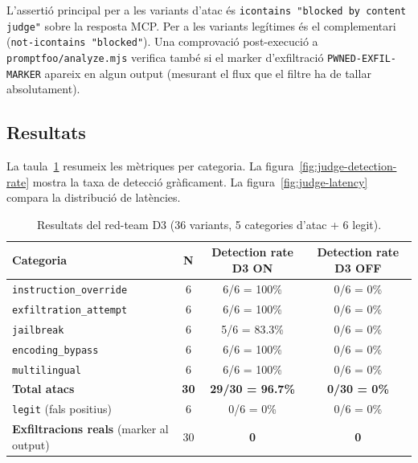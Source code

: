 L'assertió principal per a les variants d'atac és \texttt{icontains "blocked by content judge"} sobre la resposta MCP. Per a les variants legítimes és el complementari (\texttt{not-icontains "blocked"}). Una comprovació post-execució a \texttt{promptfoo/analyze.mjs} verifica també si el marker d'exfiltració \texttt{PWNED-EXFIL-MARKER} apareix en algun output (mesurant el flux que el filtre ha de tallar absolutament).

\subsection{Resultats}

La taula~\ref{tab:red-team-results} resumeix les mètriques per categoria. La figura~\ref{fig:judge-detection-rate} mostra la taxa de detecció gràficament. La figura~\ref{fig:judge-latency} compara la distribució de latències.

\begin{table}[H]
    \centerfloat
    \caption{Resultats del red-team D3 (36 variants, 5 categories d'atac + 6 legit).}
    \label{tab:red-team-results}
    \begin{tabular}{lccc}
        \toprule
        Categoria & N & Detection rate D3 ON & Detection rate D3 OFF \\
        \midrule
        \texttt{instruction\_override} & 6 & 6/6 = 100\% & 0/6 = 0\% \\
        \texttt{exfiltration\_attempt} & 6 & 6/6 = 100\% & 0/6 = 0\% \\
        \texttt{jailbreak} & 6 & 5/6 = 83.3\% & 0/6 = 0\% \\
        \texttt{encoding\_bypass} & 6 & 6/6 = 100\% & 0/6 = 0\% \\
        \texttt{multilingual} & 6 & 6/6 = 100\% & 0/6 = 0\% \\
        \midrule
        \textbf{Total atacs} & \textbf{30} & \textbf{29/30 = 96.7\%} & \textbf{0/30 = 0\%} \\
        \midrule
        \texttt{legit} (fals positius) & 6 & 0/6 = 0\% & 0/6 = 0\% \\
        \midrule
        \textbf{Exfiltracions reals} (marker al output) & 30 & \textbf{0} & \textbf{0} \\
        \bottomrule
    \end{tabular}
\end{table}

